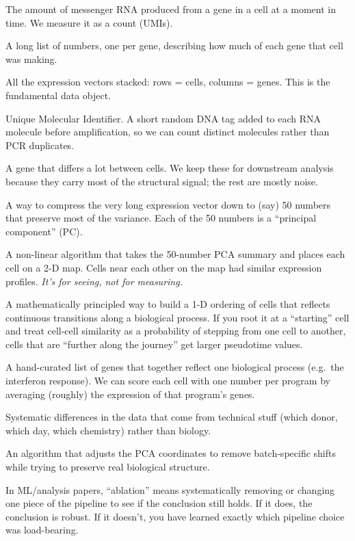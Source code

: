\documentclass[11pt]{article}
\begin{document}
\begin{description}[style=nextline,leftmargin=0pt]
\item[Gene expression] The amount of messenger RNA produced from a gene in a
      cell at a moment in time. We measure it as a count (UMIs).
\item[Expression vector of a cell] A long list of numbers, one per gene,
      describing how much of each gene that cell was making.
\item[Matrix \texttt{X}] All the expression vectors stacked: rows = cells,
      columns = genes. This is the fundamental data object.
\item[UMI] Unique Molecular Identifier. A short random DNA tag added to each
      RNA molecule before amplification, so we can count distinct molecules
      rather than PCR duplicates.
\item[HVG (Highly Variable Gene)] A gene that differs a lot between cells.
      We keep these for downstream analysis because they carry most of the
      structural signal; the rest are mostly noise.
\item[PCA (Principal Component Analysis)] A way to compress the very long
      expression vector down to (say) 50 numbers that preserve most of the
      variance. Each of the 50 numbers is a ``principal component'' (PC).
\item[UMAP] A non-linear algorithm that takes the 50-number PCA summary and
      places each cell on a 2-D map. Cells near each other on the map had
      similar expression profiles. \emph{It's for seeing, not for measuring.}
\item[Diffusion map / diffusion pseudotime (DPT)] A mathematically principled
      way to build a 1-D ordering of cells that reflects continuous
      transitions along a biological process. If you root it at a ``starting''
      cell and treat cell-cell similarity as a probability of stepping from
      one cell to another, cells that are ``further along the journey'' get
      larger pseudotime values.
\item[Gene program] A hand-curated list of genes that together reflect one
      biological process (e.g.\ the interferon response). We can score each
      cell with one number per program by averaging (roughly) the expression
      of that program's genes.
\item[Batch effect] Systematic differences in the data that come from
      technical stuff (which donor, which day, which chemistry) rather than
      biology.
\item[Batch correction (Harmony)] An algorithm that adjusts the PCA
      coordinates to remove batch-specific shifts while trying to preserve
      real biological structure.
\item[Ablation] In ML/analysis papers, ``ablation'' means systematically
      removing or changing one piece of the pipeline to see if the
      conclusion still holds. If it does, the conclusion is robust. If it
      doesn't, you have learned exactly which pipeline choice was
      load-bearing.
\end{description}
\end{document}
